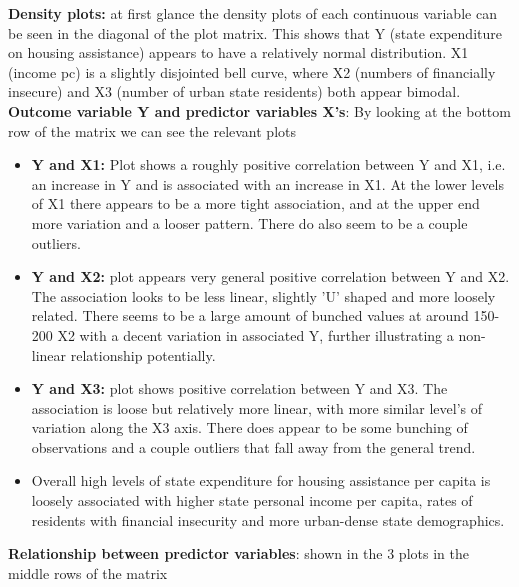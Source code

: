 \documentclass[12pt,letterpaper]{article}
\begin{document}
\noindent
\textbf{Density plots:} at first glance the density plots of each continuous variable can be seen in the diagonal of the plot matrix. This shows that Y (state expenditure on housing assistance) appears to have a relatively normal distribution. X1 (income pc) is a slightly disjointed bell curve, where X2 (numbers of financially insecure) and X3 (number of urban state residents) both appear bimodal. \\

\noindent
\textbf{Outcome variable Y and predictor variables X's}: By looking at the bottom row of the matrix we can see the relevant plots
\begin{itemize}
	\item \textbf{Y and X1: } Plot shows a roughly positive correlation between Y and X1, i.e. an increase in Y and is associated with an increase in X1. At the lower levels of X1 there appears to be a more tight association, and at the upper end more variation and a looser pattern. There do also seem to be a couple outliers. 
	\item \textbf{Y and X2: } plot appears very general positive correlation between Y and X2. The association looks to be less linear, slightly 'U' shaped and more loosely related. There seems to be a large amount of bunched values at around 150-200 X2 with a decent variation in associated Y, further illustrating a non-linear relationship potentially. 
	\item \textbf{Y and X3: } plot shows positive correlation between Y and X3. The association is loose but relatively more linear, with more similar level's of variation along the X3 axis. There does appear to be some bunching of observations and a couple outliers that fall away from the general trend. 
	\item Overall high levels of state expenditure for housing assistance per capita is loosely associated with higher state personal income per capita, rates of residents with financial insecurity and more urban-dense state demographics. 
\end{itemize}

\noindent
\textbf{Relationship between predictor variables}: shown in the 3 plots in the middle rows of the matrix
\end{document}
